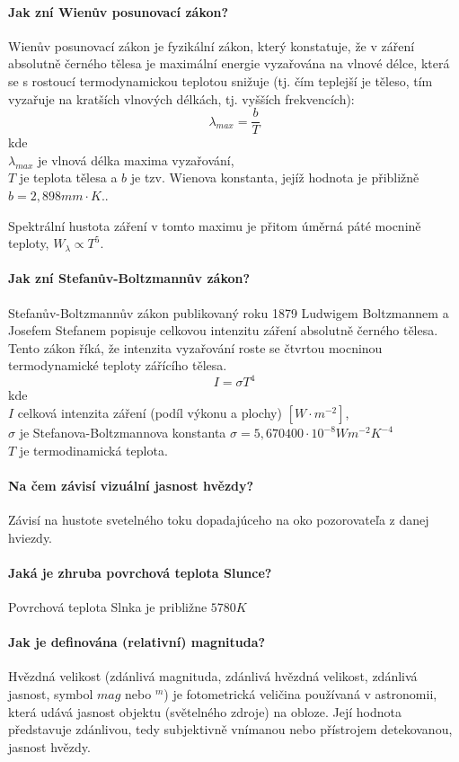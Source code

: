 \documentclass[11pt,a4paper,notitlepage]{article}
\begin{document}
\paragraph{Jak zní Wienův posunovací zákon?}
Wienův posunovací zákon je fyzikální zákon, který konstatuje, že v záření absolutně černého tělesa je maximální energie vyzařována na vlnové délce, která se s rostoucí termodynamickou teplotou snižuje (tj. čím teplejší je těleso, tím vyzařuje na kratších vlnových délkách, tj. vyšších frekvencích):
\[ \lambda_{max} = \frac{b}{T} \]
kde\\
$ \lambda_{max}  $ je vlnová délka maxima vyzařování,\\
$ T $ je teplota tělesa a 
$ b $ je tzv. Wienova konstanta, jejíž hodnota je přibližně $ b = 2,898 mm\cdot K. $.

Spektrální hustota záření v tomto maximu je přitom úměrná páté mocnině teploty, 
$ W_\lambda \propto T^5 $.
\paragraph{Jak zní Stefanův-Boltzmannův zákon?}
Stefanův-Boltzmannův zákon publikovaný roku 1879 Ludwigem Boltzmannem a Josefem Stefanem popisuje celkovou intenzitu záření absolutně černého tělesa. Tento zákon říká, že intenzita vyzařování roste se čtvrtou mocninou termodynamické teploty zářícího tělesa.
\[ I = \sigma T^4 \]
kde\\
$ I $ celková intenzita zá\v{r}ení (podíl výkonu a plochy) $ [W\cdot m^{-2}] $,\\
$ \sigma $ je Stefanova-Boltzmannova konstanta 
$ \sigma = 5,670400 \cdot 10^{-8} W m^{-2} K^{-4}  $\\
$ T $ je termodinamická teplota.
\paragraph{Na čem závisí vizuální jasnost hvězdy?}
Závisí na hustote svetelného toku dopadajúceho na oko pozorovateľa z danej hviezdy.
\paragraph{Jaká je zhruba povrchová teplota Slunce?}
Povrchová teplota Slnka je približne $ 5780K $
\paragraph{Jak je definována (relativní) magnituda?}
Hvězdná velikost (zdánlivá magnituda, zdánlivá hvězdná velikost, zdánlivá jasnost, symbol
$ mag $ nebo $ ^m $) je fotometrická veličina používaná v astronomii, 
která udává jasnost objektu (světelného zdroje) na obloze.
Její hodnota představuje zdánlivou, tedy subjektivně vnímanou nebo přístrojem detekovanou,
jasnost hvězdy.
\end{document}
